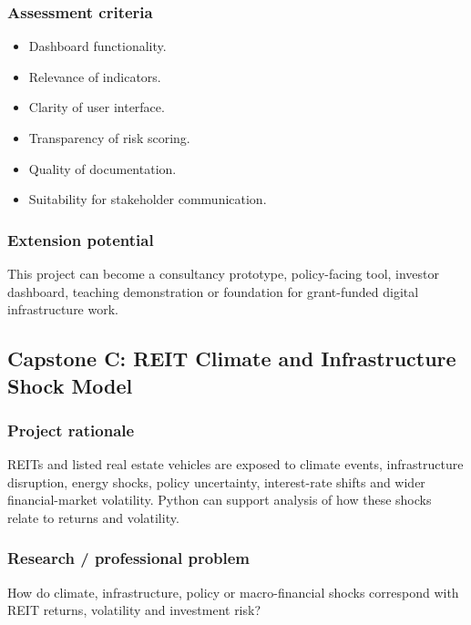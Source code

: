 \documentclass[
  a4paper,
]{article}
\providecommand{\tightlist}{%
  \setlength{\itemsep}{0pt}\setlength{\parskip}{0pt}}
\begin{document}
\subsubsection{Assessment criteria}\label{assessment-criteria-1}

\begin{itemize}
\tightlist
\item
  Dashboard functionality.
\item
  Relevance of indicators.
\item
  Clarity of user interface.
\item
  Transparency of risk scoring.
\item
  Quality of documentation.
\item
  Suitability for stakeholder communication.
\end{itemize}

\subsubsection{Extension potential}\label{extension-potential-1}

This project can become a consultancy prototype, policy-facing tool,
investor dashboard, teaching demonstration or foundation for
grant-funded digital infrastructure work.

\subsection{Capstone C: REIT Climate and Infrastructure Shock
Model}\label{capstone-c-reit-climate-and-infrastructure-shock-model}

\subsubsection{Project rationale}\label{project-rationale-2}

REITs and listed real estate vehicles are exposed to climate events,
infrastructure disruption, energy shocks, policy uncertainty,
interest-rate shifts and wider financial-market volatility. Python can
support analysis of how these shocks relate to returns and volatility.

\subsubsection{Research / professional
problem}\label{research-professional-problem-2}

How do climate, infrastructure, policy or macro-financial shocks
correspond with REIT returns, volatility and investment risk?
\end{document}
